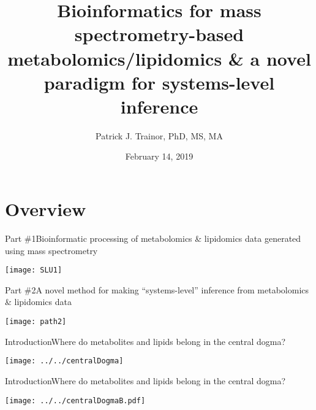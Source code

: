 \documentclass[xcolor=dvipsnames]{beamer}
\begin{document}
	
\title[Bioinformatics for MS and Systems Inference]{{\bf Bioinformatics for mass spectrometry-based metabolomics/lipidomics \& a novel paradigm for systems-level inference}}
\author[P.J. Trainor]{Patrick J. Trainor, PhD, MS, MA}
\date[February 2019]{February 14, 2019}

\begin{frame}
	\titlepage
\end{frame}

\section{Overview}

\begin{frame}{Part \#1}{Bioinformatic processing of metabolomics \& lipidomics data generated using mass spectrometry}
\vspace{-15pt}
\begin{center}
	\texttt{[image: SLU1]}
\end{center}
\end{frame}

\begin{frame}{Part \#2}{A novel method for making ``systems-level'' inference from metabolomics \& lipidomics data}
\vspace{-15pt}
\begin{center}
\texttt{[image: path2]}
\end{center}
\end{frame}

\begin{frame}{Introduction}{Where do metabolites and lipids belong in the central dogma?}
\vspace{-7 pt}
\begin{center}
		\texttt{[image: ../../centralDogma]}
	\end{center}
\end{frame}

\begin{frame}{Introduction}{Where do metabolites and lipids belong in the central dogma?}
\vspace{-7 pt}
\begin{center}
	\texttt{[image: ../../centralDogmaB.pdf]}
\end{center}
\end{frame}
\end{document}
